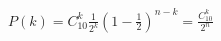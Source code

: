 \documentclass[A4,11pt]{article}
\begin{document}
\thispagestyle{empty}

$P(k) = C_{10}^k \frac{1}{2^k}\left(1-\frac{1}{2}\right)^{n-k} = \frac{C_{10}^k}{2^n}$
\end{document}
